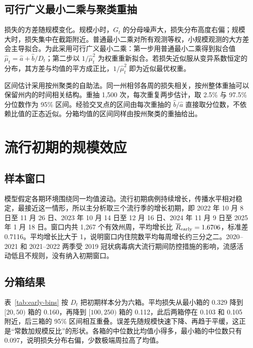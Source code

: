 \subsection{可行广义最小二乘与聚类重抽}

损失的方差随规模变化。规模小时，$G_t$ 的分母噪声大，损失分布高度右偏；规模大时，损失集中在截距附近。普通最小二乘对所有观测等权，小规模观测的大方差会主导拟合。为此采用可行广义最小二乘\citep{wooldridge2010econometric}：第一步用普通最小二乘得到拟合值 $\hat\mu_t=\hat a+\hat b/D_t$；第二步以 $1/\hat\mu_t^2$ 为权重重新拟合。若损失近似服从变异系数恒定的分布，其方差与均值的平方成正比，$1/\hat\mu_t^2$ 即为近似最优权重。

区间估计采用按州聚类的自助法\citep{cameron2008bootstrap, cameron2015practitioner}。同一州相邻各周的损失相关，按州整体重抽可以保留州内的时间相关结构。重抽 1,500 次，每次重复两步估计，取 2.5\% 与 97.5\% 分位数作为 95\% 区间。经验交叉点的区间由每次重抽的 $\hat b/\hat a$ 直接取分位数，不依赖比值的正态近似。分箱均值的区间同样由按州聚类的重抽给出。

\section{流行初期的规模效应}
\label{sec:emp-early}

\subsection{样本窗口}

模型假定各期环境围绕同一均值波动。流行初期病例持续增长，传播水平相对稳定，最接近这一情形，所以主分析取三个流行季的增长初期，即 2022 年 10 月 8 日至 11 月 26 日、2023 年 10 月 14 日至 12 月 16 日、2024 年 11 月 9 日至 2025 年 1 月 18 日。窗口内共 1,267 个有效州周，平均增长比 $\overline{R}_{\mathrm{early}}=1.6706$，标准差 0.7116。平均增长比大于 1，说明窗口内住院数平均每周增长约三分之二。2020--2021 和 2021--2022 两季受 2019 冠状病毒病大流行期间防控措施的影响，流感活动低且不规则，没有纳入初期窗口。

\subsection{分箱结果}

表~\ref{tab:early-bins} 按 $D_t$ 把初期样本分为六箱。平均损失从最小箱的 0.329 降到 $[20,50)$ 箱的 0.160，再降到 $[100,250)$ 箱的 0.112，此后两箱停在 0.103 和 0.105 附近，后三箱的 95\% 区间相互重叠。误差先随规模快速下降、再趋于平缓，这正是“常数加规模反比”的形状。各箱的中位数比均值小得多，最小箱的中位数只有 0.097，说明损失分布右偏，少数极端周拉高了均值。

